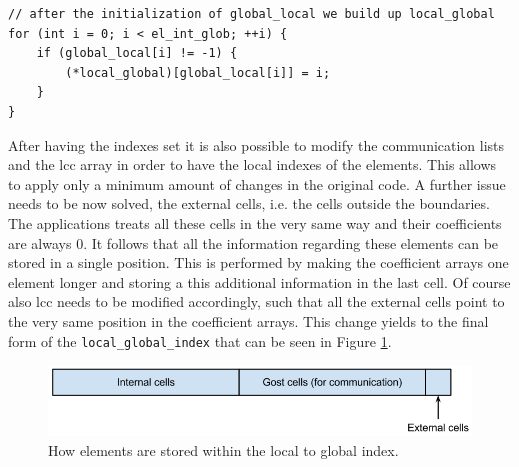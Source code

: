\documentclass[12pt, a4paper]{article}
\begin{document}
  \begin{verbatim}
// after the initialization of global_local we build up local_global
for (int i = 0; i < el_int_glob; ++i) {
    if (global_local[i] != -1) {
        (*local_global)[global_local[i]] = i;
    }
}
  \end{verbatim}

  After having the indexes set it is also possible to modify the communication 
  lists and the lcc array in order to have the local indexes of the elements. 
  This allows to apply only a minimum amount of changes in the original code.
  A further issue needs to be now solved, the external cells, i.e. the cells
  outside the boundaries. The applications treats all these cells in the very
  same way and their coefficients are always $0$. It follows that all the
  information regarding these elements can be stored in a single position. This
  is performed by making the coefficient arrays one element longer and storing a
  this additional information in the last cell. Of course also lcc needs to be
  modified accordingly, such that all the external cells point to the very same
  position in the coefficient arrays. This change yields to the final form of
  the \verb=local_global_index= that can be seen in Figure \ref{fig:array}.
  \begin{figure}[h]
    \begin{centering}
      \includegraphics[width=1\textwidth]{figures/array.png}
      \par\end{centering}
    \caption{
      How elements are stored within the local to global index. 
      \label{fig:array}
    }
  \end{figure}
\end{document}
